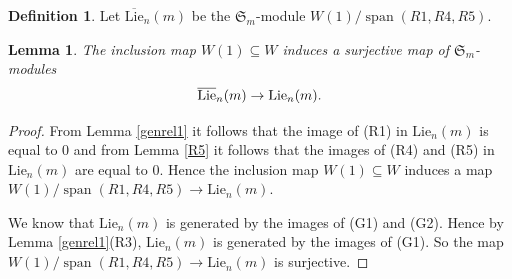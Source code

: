 \documentclass[11pt]{amsart}
\newtheorem{lem}[thm]{Lemma}
\theoremstyle{definition}
\newtheorem{defn}[thm]{Definition}
\numberwithin{equation}{section}
\DeclareMathOperator{\spn}{span}
\begin{document}
\begin{defn}\label{liebar}
	Let $\overline{\text{Lie}}_n(m)$ be the $\mathfrak{S}_m$-module $W(1)/\spn(R1, R4, R5)$.\end{defn}
\begin{lem}\label{liebarsur} The inclusion map $W(1) \subseteq W$ induces a surjective map of $\mathfrak{S}_m$-modules \[\overline{\textup{Lie}}_n(m) \to \textup{Lie}_n(m).\]
\end{lem}
\begin{proof}
From Lemma \ref{genrel1} it follows that the image of (R1) in $\text{Lie}_n(m)$  is equal to 0 and from Lemma \ref{R5} it follows that the images of (R4) and (R5) in $\text{Lie}_n(m)$ are equal to 0. Hence the inclusion map $W(1) \subseteq W$ induces a map $W(1)/\spn(R1, R4, R5) \to \text{Lie}_n(m)$.

We know that $\text{Lie}_n(m)$ is generated by the images of (G1) and (G2). Hence by Lemma \ref{genrel1}(R3), $\text{Lie}_n(m)$ is generated by the images of (G1). So the map $W(1)/\spn(R1, R4, R5) \to \text{Lie}_n(m)$ is surjective.
\end{proof}
\end{document}
